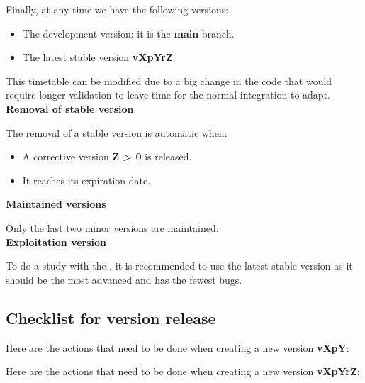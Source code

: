 Finally, at any time we have the following versions:
\begin{itemize}
\item The development version: it is the \textbf{main} branch.
\item The latest stable version \textbf{vXpYrZ}.
\end{itemize}

This timetable can be modified due to a big change in the code that would
require longer validation to leave time for the normal integration to adapt.\\

\textbf{Removal of stable version}

The removal of a stable version is automatic when:
\begin{itemize}
  \item A corrective version \textbf{Z > 0} is released.
\item It reaches its expiration date.
\end{itemize}

\textbf{Maintained versions}

Only the last two minor versions are maintained.\\

\textbf{Exploitation version}

To do a study with the \telemacsystem{}, it is recommended to use the latest
stable version as it should be the most advanced and has the fewest bugs.

\subsection{Checklist for version release}

Here are the actions that need to be done when creating a new version
\textbf{vXpY}\@:

Here are the actions that need to be done when creating a new version
\textbf{vXpYrZ}\@:

